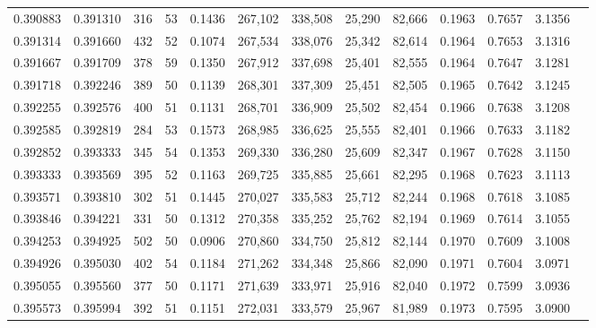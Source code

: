 \begin{tabular}{rrrrrrrrrrrrr}
0.390883 & 0.391310 &    316 &    53 &                                     0.1436 & 267,102 & 338,508 &  25,290 &  82,666 & 0.1963 & 0.7657 & 3.1356 \\
0.391314 & 0.391660 &    432 &    52 &                                     0.1074 & 267,534 & 338,076 &  25,342 &  82,614 & 0.1964 & 0.7653 & 3.1316 \\
0.391667 & 0.391709 &    378 &    59 &                                     0.1350 & 267,912 & 337,698 &  25,401 &  82,555 & 0.1964 & 0.7647 & 3.1281 \\
0.391718 & 0.392246 &    389 &    50 &                                     0.1139 & 268,301 & 337,309 &  25,451 &  82,505 & 0.1965 & 0.7642 & 3.1245 \\
0.392255 & 0.392576 &    400 &    51 &                                     0.1131 & 268,701 & 336,909 &  25,502 &  82,454 & 0.1966 & 0.7638 & 3.1208 \\
0.392585 & 0.392819 &    284 &    53 &                                     0.1573 & 268,985 & 336,625 &  25,555 &  82,401 & 0.1966 & 0.7633 & 3.1182 \\
0.392852 & 0.393333 &    345 &    54 &                                     0.1353 & 269,330 & 336,280 &  25,609 &  82,347 & 0.1967 & 0.7628 & 3.1150 \\
0.393333 & 0.393569 &    395 &    52 &                                     0.1163 & 269,725 & 335,885 &  25,661 &  82,295 & 0.1968 & 0.7623 & 3.1113 \\
0.393571 & 0.393810 &    302 &    51 &                                     0.1445 & 270,027 & 335,583 &  25,712 &  82,244 & 0.1968 & 0.7618 & 3.1085 \\
0.393846 & 0.394221 &    331 &    50 &                                     0.1312 & 270,358 & 335,252 &  25,762 &  82,194 & 0.1969 & 0.7614 & 3.1055 \\
0.394253 & 0.394925 &    502 &    50 &                                     0.0906 & 270,860 & 334,750 &  25,812 &  82,144 & 0.1970 & 0.7609 & 3.1008 \\
0.394926 & 0.395030 &    402 &    54 &                                     0.1184 & 271,262 & 334,348 &  25,866 &  82,090 & 0.1971 & 0.7604 & 3.0971 \\
0.395055 & 0.395560 &    377 &    50 &                                     0.1171 & 271,639 & 333,971 &  25,916 &  82,040 & 0.1972 & 0.7599 & 3.0936 \\
0.395573 & 0.395994 &    392 &    51 &                                     0.1151 & 272,031 & 333,579 &  25,967 &  81,989 & 0.1973 & 0.7595 & 3.0900 \\

\end{tabular}
